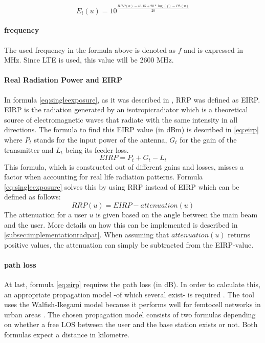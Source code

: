 \begin{equation}
E_i(u) = 10^{\frac{RRP(u) - 43.15 + 20*\log(f)- PL(u)}{20}}
\label{eq:singleexposure}
\end{equation}

\paragraph{frequency}
The used frequency in the formula above is denoted as $f$ and is expressed in MHz. Since LTE is used, this value will be 2600 MHz.

\paragraph{Real Radiation Power and EIRP}
In formula \ref{eq:singleexposure}, as it was described in \cite{J6_originalExposureFormula, J1}, 
\gls{RRP} was defined as \gls{EIRP}. \gls{EIRP} is the radiation generated by an \gls{isotropicradiator} which is
a theoretical source of electromagnetic waves that radiate with the same intensity in all directions. 
The formula to find this \gls{EIRP} value (in dBm) is described in \ref{eq:eirp}
where $P_t$ stands for the input power of the antenna, $G_t$ for the gain of the transmitter and $L_t$ being its feeder loss.
\begin{equation}
EIRP = P_t + G_t - L_t
\label{eq:eirp}
\end{equation}
This formula, which is constructed out of different gains and losses, misses a factor when accounting for real life radiation patterns.
Formula \ref{eq:singleexposure} solves this by using \gls{RRP} instead of \gls{EIRP} which can be defined as follows:
\begin{equation}
RRP(u) = EIRP - attenuation(u)
\label{eq:rrp}
\end{equation}
The attenuation for a user $u$ is given based on the angle between the main beam and the user. More details on how this can be implemented is described in \ref{subsec:implementationradpat}.
When assuming that $attenuation(u)$ returns positive values, the attenuation can simply be subtracted from the EIRP-value.
\paragraph{path loss}
\label{subsec:pl}
At last, formula \ref{eq:eirp} requires the path loss (in dB). In order to calculate this, an appropriate propagation model -of which several exist- is required .
The tool uses the Walfish-Ikegami model because it performs well for femtocell networks in urban areas \cite{J2}. %
The chosen propagation model consists of two formulas depending on whether a free \gls{LOS} between the user and the base station exists or not. Both formulas expect a distance in kilometre. %

